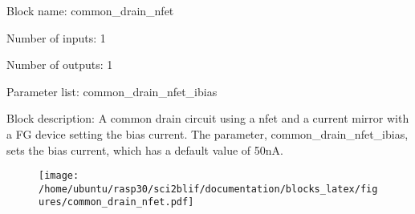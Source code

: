 \pagebreak

Block name: common\_drain\_nfet

Number of inputs: 1

Number of outputs: 1

Parameter list: common\_drain\_nfet\_ibias

Block description: 
A common drain circuit using a nfet and a current mirror with a FG device setting the bias current. The parameter, common\_drain\_nfet\_ibias, sets the bias current, which has a default value of 50nA.

\begin{figure}[H]  %
\texttt{[image: /home/ubuntu/rasp30/sci2blif/documentation/blocks\_latex/figures/common\_drain\_nfet.pdf]}
\end{figure}

